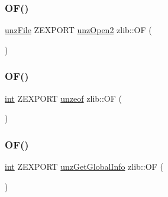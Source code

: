 \mbox{\label{namespacezlib_a98d73ab7a866fea2ec4c8565b43df518}} 
\subsubsection{\texorpdfstring{O\+F()}{OF()}\hspace{0.1cm}{\footnotesize\ttfamily [4/13]}}
{\footnotesize\ttfamily \hyperlink{namespacezlib_a48c1eb530e72d2132ea9cb6648f4047e}{unz\+File} Z\+E\+X\+P\+O\+RT \hyperlink{unzip_8c_a899fa69e894354e48aab8869e13fd396}{unz\+Open2} zlib\+::\+OF (\begin{DoxyParamCaption}\item[{(const char $\ast$path, \hyperlink{namespacezlib_a4ada5a935fba7f21209bc451eb7ffbc7}{zlib\+\_\+filefunc\+\_\+def} $\ast$pzlib\+\_\+filefunc\+\_\+def)}]{ }\end{DoxyParamCaption})}

\mbox{\label{namespacezlib_ac2146e287516d1f6d752ff7aadcc701a}} 
\subsubsection{\texorpdfstring{O\+F()}{OF()}\hspace{0.1cm}{\footnotesize\ttfamily [5/13]}}
{\footnotesize\ttfamily \hyperlink{namespacezlib_a0c9da18d93722fcf02a354ae2b6ec1ba}{int} Z\+E\+X\+P\+O\+RT \hyperlink{unzip_8c_a564f8ada96a5b2e3c5815306fa146d68}{unzeof} zlib\+::\+OF (\begin{DoxyParamCaption}\item[{(\hyperlink{namespacezlib_a48c1eb530e72d2132ea9cb6648f4047e}{unz\+File} file)}]{ }\end{DoxyParamCaption})}

\mbox{\label{namespacezlib_a97b37021181fc23f5ea23211508ab36a}} 
\subsubsection{\texorpdfstring{O\+F()}{OF()}\hspace{0.1cm}{\footnotesize\ttfamily [6/13]}}
{\footnotesize\ttfamily \hyperlink{namespacezlib_a0c9da18d93722fcf02a354ae2b6ec1ba}{int} Z\+E\+X\+P\+O\+RT \hyperlink{unzip_8c_af05d6e3eac6ec396d9d134ca140fec61}{unz\+Get\+Global\+Info} zlib\+::\+OF (\begin{DoxyParamCaption}\item[{(\hyperlink{namespacezlib_a48c1eb530e72d2132ea9cb6648f4047e}{unz\+File} file, \hyperlink{namespacezlib_a720c995c51babbb6d5cbf3e022a4c7b4}{unz\+\_\+global\+\_\+info} $\ast$pglobal\+\_\+info)}]{ }\end{DoxyParamCaption})}

